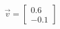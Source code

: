 \documentclass[preview]{standalone}
\begin{document}
\begin{align*}
\vec{v}=\begin{bmatrix}0.6\\-0.1\end{bmatrix}
\end{align*}
\end{document}
